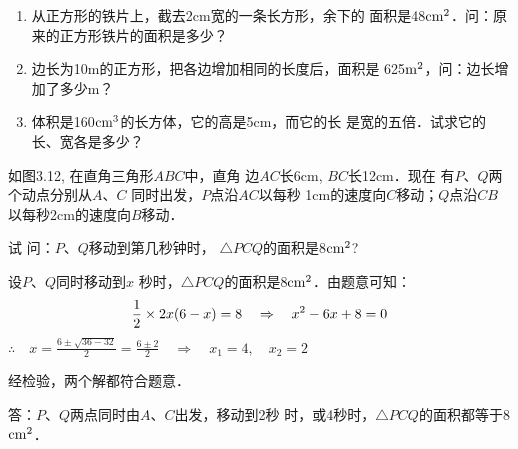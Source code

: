 \begin{ex}
\begin{enumerate}
    \item 从正方形的铁片上，截去2cm宽的一条长方形，余下的
    面积是48${\rm cm}^2$．问：原来的正方形铁片的面积是多少？

    \item 边长为10m的正方形，把各边增加相同的长度后，面积是
625${\rm m}^2$，问：边长增加了多少m？
\item 体积是160${\rm cm}^3$的长方体，它的高是5cm，而它的长
是宽的五倍．试求它的长、宽各是多少？
\end{enumerate}
    
\end{ex}



\begin{example}
    如图3.12, 在直角三角形$ABC$中，直角
    边$AC$长6cm, $BC$长12cm．现在
    有$P$、$Q$两个动点分别从$A$、$C$
    同时出发，$P$点沿$AC$以每秒
    1cm的速度向$C$移动；$Q$点沿$CB$
    以每秒2cm的速度向$B$移动．
    
    试
    问：$P$、$Q$移动到第几秒钟时，
    $\triangle PCQ$的面积是8${\rm cm^2}$?
\end{example}

\begin{figure}[htp]
    \begin{center}
    \end{center}
    \caption{}
\end{figure}



\begin{solution}
设$P$、$Q$同时移动到$x$
秒时，$\triangle PCQ$的面积是8${\rm cm^2}$．由题意可知：
\[\dfrac{1}{2}\times 2x(6-x)=8\quad \Rightarrow\quad x^2-6x+8=0\]
$\therefore\quad x=\frac{6\pm\sqrt{36-32}}{2}=\frac{6\pm 2}{2}\quad\Rightarrow\quad x_1=4,\quad x_2=2$

经检验，两个解都符合题意．

答：$P$、$Q$两点同时由$A$、$C$出发，移动到2秒
时，或4秒时，$\triangle PCQ$的面积都等于8${\rm cm^2}$．
\end{solution}

